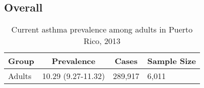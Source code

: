 


\subsection{Overall}




\begin{table}[H]
\caption{Current asthma prevalence among adults in Puerto Rico, 2013\label{tab:Overall.tabl.Asthma.2013}} 
\begin{center}
\begin{tabular}{llll}
\hline\hline
\multicolumn{1}{l}{Group}&\multicolumn{1}{c}{Prevalence}&\multicolumn{1}{c}{Cases}&\multicolumn{1}{c}{Sample Size}\tabularnewline
\hline
Adults&10.29 (9.27-11.32)&289,917&6,011\tabularnewline
\hline
\end{tabular}\end{center}

\end{table}




